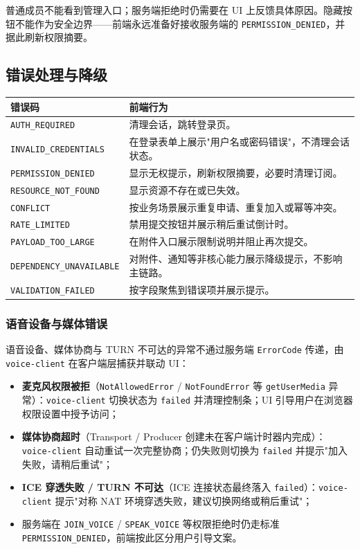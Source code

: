 普通成员不能看到管理入口；服务端拒绝时仍需要在 UI 上反馈具体原因。隐藏按钮不能作为安全边界——前端永远准备好接收服务端的 \texttt{PERMISSION\_DENIED}，并据此刷新权限摘要。

\subsection{错误处理与降级}

\noindent\begin{tabularx}{\textwidth}{L{3.6cm}Y}
  \toprule
  错误码 & 前端行为 \\
  \midrule
  \texttt{AUTH\_REQUIRED} & 清理会话，跳转登录页。 \\
  \texttt{INVALID\_CREDENTIALS} & 在登录表单上展示"用户名或密码错误"，不清理会话状态。 \\
  \texttt{PERMISSION\_DENIED} & 显示无权提示，刷新权限摘要，必要时清理订阅。 \\
  \texttt{RESOURCE\_NOT\_FOUND} & 显示资源不存在或已失效。 \\
  \texttt{CONFLICT} & 按业务场景展示重复申请、重复加入或幂等冲突。 \\
  \texttt{RATE\_LIMITED} & 禁用提交按钮并展示稍后重试倒计时。 \\
  \texttt{PAYLOAD\_TOO\_LARGE} & 在附件入口展示限制说明并阻止再次提交。 \\
  \texttt{DEPENDENCY\_UNAVAILABLE} & 对附件、通知等非核心能力展示降级提示，不影响主链路。 \\
  \texttt{VALIDATION\_FAILED} & 按字段聚焦到错误项并展示提示。 \\
  \bottomrule
\end{tabularx}

\subsubsection{语音设备与媒体错误}

语音设备、媒体协商与 TURN 不可达的异常不通过服务端 \texttt{ErrorCode} 传递，由 \texttt{voice-client} 在客户端层捕获并联动 UI：

\begin{itemize}
  \item \textbf{麦克风权限被拒}（\texttt{NotAllowedError} / \texttt{NotFoundError} 等 \texttt{getUserMedia} 异常）：\texttt{voice-client} 切换状态为 \texttt{failed} 并清理控制条；UI 引导用户在浏览器权限设置中授予访问；
  \item \textbf{媒体协商超时}（Transport / Producer 创建未在客户端计时器内完成）：\texttt{voice-client} 自动重试一次完整协商；仍失败则切换为 \texttt{failed} 并提示"加入失败，请稍后重试"；
  \item \textbf{ICE 穿透失败 / TURN 不可达}（ICE 连接状态最终落入 \texttt{failed}）：\texttt{voice-client} 提示"对称 NAT 环境穿透失败，建议切换网络或稍后重试"；
  \item 服务端在 \texttt{JOIN\_VOICE} / \texttt{SPEAK\_VOICE} 等权限拒绝时仍走标准 \texttt{PERMISSION\_DENIED}，前端按此区分用户引导文案。
\end{itemize}

